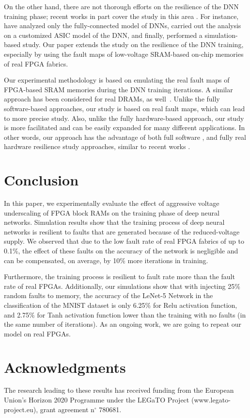 \documentclass[conference]{IEEEtran}
\begin{document}
On the other hand, there are not thorough efforts on the resilience of the DNN training phase; recent works in part cover the study in this area \cite{review1, kim2018energy, kim2018matic, zhang2018analyzing, hacene2019training}. For instance, \cite{kim2018energy, kim2018matic} have analyzed only the fully-connected model of DNNs, \cite{zhang2018analyzing} carried out the analysis on a customized ASIC model of the DNN, and finally, \cite{hacene2019training} performed a simulation-based study. Our paper extends the study on the resilience of the DNN training, especially by using the fault maps of low-voltage SRAM-based on-chip memories of real FPGA fabrics.    

Our experimental methodology is based on emulating the real fault maps of FPGA-based SRAM memories during the DNN training iterations. A similar approach has been considered for real DRAMs, as well~\cite{koppula2019eden, review2}. Unlike the fully software-based approaches, our study is based on real fault maps, which can lead to more precise study. Also, unlike the fully hardware-based approach, our study is more facilitated and can be easily expanded for many different applications. In other words, our approach has the advantage of both full software \cite{chang2019assessing}, and fully real hardware \cite{bertran2014voltage} resilience study approaches, similar to recent works \cite{denkinger2019impact, koppula2019eden, chatzidimitriou2019assessing}. 


\section{Conclusion}
\label{sec:conclusion}
In this paper, we experimentally evaluate the effect of aggressive voltage underscaling of FPGA block RAMs on the training phase of deep neural networks. Simulation results show that the training process of deep neural networks is resilient to faults that are generated because of the reduced-voltage supply. We observed that due to the low fault rate of real FPGA fabrics of up to 0.1\%, the effect of these faults on the accuracy of the network is negligible and can be compensated, on average,  by 10\% more iterations in training.

Furthermore, the training process is resilient to fault rate more than the fault rate of real FPGAs. Additionally, our simulations show that with injecting 25\% random faults to memory, the accuracy of the LeNet-5 Network in the classification of the MNIST dataset is only 6.25\%  for Relu activation function, and 2.75\% for Tanh activation function lower than the training with no faults (in the same number of iterations). As an ongoing work, we are going to repeat our model on real FPGAs.

\section{Acknowledgments}

The research leading to these results has received funding
from the European Union’s Horizon 2020 Programme under
the LEGaTO Project (www.legato-project.eu), grant
agreement n$^\circ$  780681.



\end{document}
